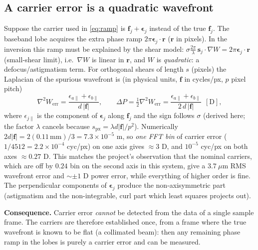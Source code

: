 \documentclass[11pt,a4paper]{article}
\theoremstyle{definition}
\newcommand{\vr}{\bm{r}}
\newcommand{\vs}{\bm{s}}
\newcommand{\vf}{\bm{f}}
\begin{document}
\subsection{A carrier error is a quadratic wavefront}
\label{sec:degen}
Suppose the carrier used in \eqref{eq:ramp} is $\vf_j+\bm\epsilon_j$ instead of the true $\vf_j$. The baseband lobe acquires the extra phase ramp $2\pi\bm\epsilon_j\cdot\vr$ ($\vr$ in pixels).
In the inversion this ramp must be explained by the shear model: $\sigma\frac{2\pi}\lambda\,\vs_j\!\cdot\!\nabla W=2\pi\bm\epsilon_j\cdot\vr$ (small-shear limit), i.e.\ $\nabla W$ is linear in $\vr$, and $W$ is \emph{quadratic}:
a defocus/astigmatism term. For orthogonal shears of length $s$ (pixels) the Laplacian of the spurious wavefront is (in physical units, $\vf$ in cycles/px, $p$ pixel pitch)
\begin{equation}
\nabla^2W_{\mathrm{err}}=\frac{\epsilon_{a\parallel}+\epsilon_{b\parallel}}{d\,|\vf|},\qquad
\Delta P=\tfrac12\nabla^2W_{\mathrm{err}}=\frac{\epsilon_{a\parallel}+\epsilon_{b\parallel}}{2\,d\,|\vf|}\ \ [\text{D}],
\label{eq:caldefocus}
\end{equation}
where $\epsilon_{j\parallel}$ is the component of $\bm\epsilon_j$ along $\vf_j$ and the sign follows $\sigma$ (derived here; the factor $\lambda$ cancels because $s_{\mathrm{px}}=\lambda d|\vf|/p^2$).
Numerically $2d|\vf|=2(0.11\,\mathrm{mm})/3=7.3\times10^{-5}$ m, so \emph{one FFT bin} of carrier error ($1/4512=2.2\times10^{-4}$ cyc/px) on one axis gives $\approx3$ D, and $10^{-5}$ cyc/px on both axes $\approx0.27$ D.
This matches the project's observation that the nominal carriers, which are off by $0.24$ bin on the second axis in this system, give a $3.7\ \mu$m RMS wavefront error and $\sim\pm1$ D power error, while everything of higher order is fine.
The perpendicular components of $\bm\epsilon_j$ produce the non-axisymmetric part (astigmatism and the non-integrable, curl part which least squares projects out).

\textbf{Consequence.} Carrier error \emph{cannot} be detected from the data of a single sample frame. The carriers are therefore established once, from a frame where the true wavefront is known to be flat (a collimated beam):
then any remaining phase ramp in the lobes is purely a carrier error and can be measured.
\end{document}
